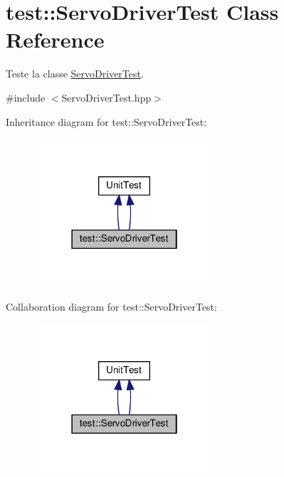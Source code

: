 \hypertarget{classtest_1_1ServoDriverTest}{}\section{test\+:\+:Servo\+Driver\+Test Class Reference}
\label{classtest_1_1ServoDriverTest}


Teste la classe \hyperlink{classtest_1_1ServoDriverTest}{Servo\+Driver\+Test}.  




{\ttfamily \#include $<$Servo\+Driver\+Test.\+hpp$>$}



Inheritance diagram for test\+:\+:Servo\+Driver\+Test\+:
\nopagebreak
\begin{figure}[H]
\begin{center}
\leavevmode
\includegraphics[width=190pt]{classtest_1_1ServoDriverTest__inherit__graph}
\end{center}
\end{figure}


Collaboration diagram for test\+:\+:Servo\+Driver\+Test\+:
\nopagebreak
\begin{figure}[H]
\begin{center}
\leavevmode
\includegraphics[width=190pt]{classtest_1_1ServoDriverTest__coll__graph}
\end{center}
\end{figure}
